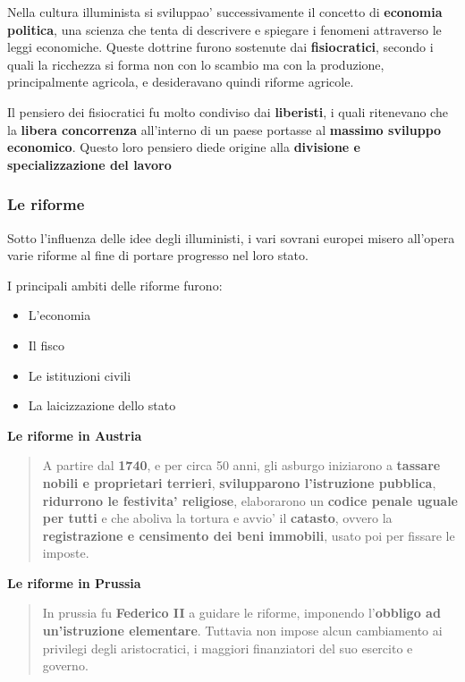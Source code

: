 \documentclass{article}
\begin{document}
{{    Nella cultura illuminista si sviluppao' successivamente il concetto di \textbf{economia politica}, una scienza che tenta di descrivere e spiegare i fenomeni attraverso le leggi economiche. Queste dottrine furono sostenute dai \textbf{fisiocratici}, secondo i quali la ricchezza si forma non con lo scambio ma con la produzione, principalmente agricola, e desideravano quindi riforme agricole.

    Il pensiero dei fisiocratici fu molto condiviso dai \textbf{liberisti}, i quali ritenevano che la \textbf{libera concorrenza} all'interno di un paese portasse al \textbf{massimo sviluppo economico}. Questo loro pensiero diede origine alla \textbf{divisione e specializzazione del lavoro}

    \subsubsection{Le riforme} %
    Sotto l'influenza delle idee degli illuministi, i vari sovrani europei misero all'opera varie riforme al fine di portare progresso nel loro stato.

    I principali ambiti delle riforme furono:

    \begin{itemize}
      \item L'economia
      \item Il fisco
      \item Le istituzioni civili
      \item La laicizzazione dello stato
    \end{itemize}

    \textbf{Le riforme in Austria}
    \begin{quote}
      A partire dal \textbf{1740}, e per circa 50 anni, gli asburgo iniziarono a \textbf{tassare nobili e proprietari terrieri}, \textbf{svilupparono l'istruzione pubblica}, \textbf{ridurrono le festivita' religiose}, elaborarono un \textbf{codice penale uguale per tutti} e che aboliva la tortura e avvio' il \textbf{catasto}, ovvero la \textbf{registrazione e censimento dei beni immobili}, usato poi per fissare le imposte.
    \end{quote}

    \textbf{Le riforme in Prussia}
    \begin{quote}
      In prussia fu \textbf{Federico II} a guidare le riforme, imponendo l'\textbf{obbligo ad un'istruzione elementare}. Tuttavia non impose alcun cambiamento ai privilegi degli aristocratici, i maggiori finanziatori del suo esercito e governo.
    \end{quote}

}}
\end{document}
